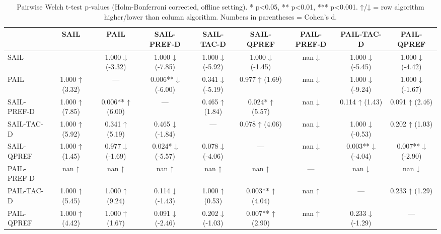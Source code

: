 \begin{table}[t]
\centering
\small
\begin{table}
\caption{Pairwise Welch t-test p-values (Holm-Bonferroni corrected, offline setting). * p<0.05, ** p<0.01, *** p<0.001. ↑/↓ = row algorithm higher/lower than column algorithm. Numbers in parentheses = Cohen's d.}
\label{tab:pairwise_offline}
\begin{tabular}{lcccccccc}
\toprule
 & SAIL & PAIL & SAIL-PREF-D & SAIL-TAC-D & SAIL-QPREF & PAIL-PREF-D & PAIL-TAC-D & PAIL-QPREF \\
\midrule
SAIL & — & 1.000 ↓ (-3.32) & 1.000 ↓ (-7.85) & 1.000 ↓ (-5.92) & 1.000 ↓ (-1.45) & nan ↓ & 1.000 ↓ (-5.45) & 1.000 ↓ (-4.42) \\
PAIL & 1.000 ↑ (3.32) & — & 0.006** ↓ (-6.00) & 0.341 ↓ (-5.19) & 0.977 ↑ (1.69) & nan ↓ & 1.000 ↓ (-9.24) & 1.000 ↓ (-1.67) \\
SAIL-PREF-D & 1.000 ↑ (7.85) & 0.006** ↑ (6.00) & — & 0.465 ↑ (1.84) & 0.024* ↑ (5.57) & nan ↓ & 0.114 ↑ (1.43) & 0.091 ↑ (2.46) \\
SAIL-TAC-D & 1.000 ↑ (5.92) & 0.341 ↑ (5.19) & 0.465 ↓ (-1.84) & — & 0.078 ↑ (4.06) & nan ↓ & 1.000 ↓ (-0.53) & 0.202 ↑ (1.03) \\
SAIL-QPREF & 1.000 ↑ (1.45) & 0.977 ↓ (-1.69) & 0.024* ↓ (-5.57) & 0.078 ↓ (-4.06) & — & nan ↓ & 0.003** ↓ (-4.04) & 0.007** ↓ (-2.90) \\
PAIL-PREF-D & nan ↑ & nan ↑ & nan ↑ & nan ↑ & nan ↑ & — & nan ↓ & nan ↓ \\
PAIL-TAC-D & 1.000 ↑ (5.45) & 1.000 ↑ (9.24) & 0.114 ↓ (-1.43) & 1.000 ↑ (0.53) & 0.003** ↑ (4.04) & nan ↑ & — & 0.233 ↑ (1.29) \\
PAIL-QPREF & 1.000 ↑ (4.42) & 1.000 ↑ (1.67) & 0.091 ↓ (-2.46) & 0.202 ↓ (-1.03) & 0.007** ↑ (2.90) & nan ↑ & 0.233 ↓ (-1.29) & — \\
\bottomrule
\end{tabular}
\end{table}
\end{table}
